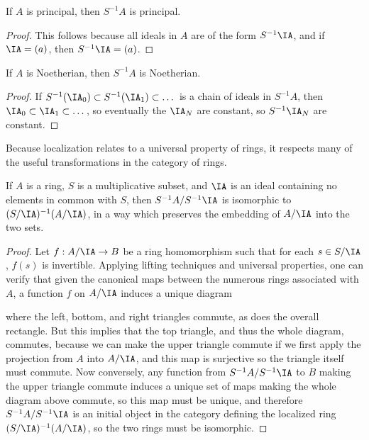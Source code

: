 \begin{prop}
    If $A$ is principal, then $S^{-1}A$ is principal.
\end{prop}
\begin{proof}
    This follows because all ideals in $A$ are of the form $S^{-1} \IA$, and if $\IA = (a)$, then $S^{-1}\IA = (a)$.
\end{proof}

\begin{prop}
    If $A$ is Noetherian, then $S^{-1}A$ is Noetherian.
\end{prop}
\begin{proof}
    If $S^{-1}(\IA_0) \subset S^{-1}(\IA_1) \subset \dots$ is a chain of ideals in $S^{-1}A$, then $\IA_0 \subset \IA_1 \subset \dots$, so eventually the $\IA_N$ are constant, so $S^{-1}\IA_N$ are constant.
\end{proof}

Because localization relates to a universal property of rings, it respects many of the useful transformations in the category of rings.

\begin{prop}
    If $A$ is a ring, $S$ is a multiplicative subset, and $\IA$ is an ideal containing no elements in common with $S$, then $S^{-1}A/S^{-1}\IA$ is isomorphic to $(S/\IA)^{-1}(A/\IA)$, in a way which preserves the embedding of $A/\IA$ into the two sets.
\end{prop}
\begin{proof}
    Let $f: A/\IA \to B$ be a ring homomorphism such that for each $s \in S/\IA$, $f(s)$ is invertible. Applying lifting techniques and universal properties, one can verify that given the canonical maps between the numerous rings associated with $A$, a function $f$ on $A/\IA$ induces a unique diagram
    \begin{center}
    \end{center}
    where the left, bottom, and right triangles commute, as does the overall rectangle. But this implies that the top triangle, and thus the whole diagram, commutes, because we can make the upper triangle commute if we first apply the projection from $A$ into $A/\IA$, and this map is surjective so the triangle itself must commute. Now conversely, any function from $S^{-1}A/S^{-1}\IA$ to $B$ making the upper triangle commute induces a unique set of maps making the whole diagram above commute, so this map must be unique, and therefore $S^{-1}A/S^{-1}\IA$ is an initial object in the category defining the localized ring $(S/\IA)^{-1}(A/\IA)$, so the two rings must be isomorphic.
\end{proof}

